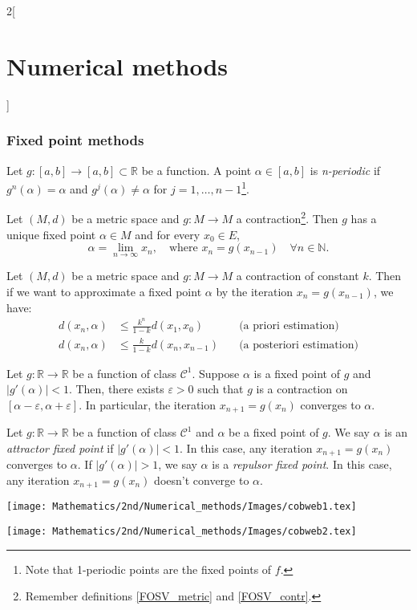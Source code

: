 \documentclass[class=article,10pt,crop=false]{standalone}
\begin{document}
\begin{multicols}{2}[\section{Numerical methods}]
\subsubsection*{Fixed point methods}
\begin{definition}
Let $g:[a,b]\rightarrow[a,b]\subset\mathbb{R}$ be a function. A point $\alpha\in[a,b]$ is \textit{n-periodic} if $g^n(\alpha)=\alpha$ and $g^j(\alpha)\ne\alpha$ for $j=1,\ldots,n-1$\footnote{Note that 1-periodic points are the fixed points of $f$.}.
\end{definition}
\begin{theorem}
Let $(M,d)$ be a metric space and $g:M\rightarrow M$ a contraction\footnote{Remember definitions \ref{FOSV_metric} and \ref{FOSV_contr}.}. Then $g$ has a unique fixed point $\alpha\in M$ and for every $x_0\in E$, $$\alpha=\lim_{n\to\infty}x_n,\quad\text{where }x_n=g(x_{n-1})\quad\forall n\in\mathbb{N}.$$
\end{theorem}
\begin{prop}
Let $(M,d)$ be a metric space and $g:M\rightarrow M$ a contraction of constant $k$. Then if we want to approximate a fixed point $\alpha$ by the iteration $x_n=g(x_{n-1})$, we have:
\begin{align*}
    d(x_n,\alpha)&\leq\frac{k^n}{1-k}d(x_1,x_0)\quad&\text{(a priori estimation)}\\
    d(x_n,\alpha)&\leq\frac{k}{1-k}d(x_n,x_{n-1})\quad&\text{(a posteriori estimation)}
\end{align*}
\end{prop}
\begin{corollary}
Let $g:\mathbb{R}\rightarrow\mathbb{R}$ be a function of class $\mathcal{C}^1$. Suppose $\alpha$ is a fixed point of $g$ and $|g'(\alpha)|<1$. Then, there exists $\varepsilon>0$ such that $g$ is a contraction on $[\alpha-\varepsilon,\alpha+\varepsilon]$. In particular, the iteration $x_{n+1}=g(x_n)$ converges to $\alpha$.
\end{corollary}
\begin{definition}
Let $g:\mathbb{R}\rightarrow\mathbb{R}$ be a function of class $\mathcal{C}^1$ and $\alpha$ be a fixed point of $g$. We say $\alpha$ is an \textit{attractor fixed point} if $|g'(\alpha)|<1$. In this case, any iteration $x_{n+1}=g(x_n)$ converges to $\alpha$. If $|g'(\alpha)|>1$, we say $\alpha$ is a \textit{repulsor fixed point}. In this case, any iteration $x_{n+1}=g(x_n)$ doesn't converge to $\alpha$.
\end{definition}
\begin{minipage}{\linewidth}
    \centering
    \begin{minipage}{0.49\linewidth} 
        \centering
        \texttt{[image: Mathematics/2nd/Numerical\_methods/Images/cobweb1.tex]} 
    \end{minipage}\hfill
    \begin{minipage}{0.49\linewidth} 
        \centering
        \texttt{[image: Mathematics/2nd/Numerical\_methods/Images/cobweb2.tex]} 
    \end{minipage}
\end{minipage}

\end{multicols}
\end{document}

